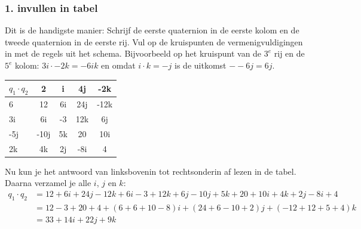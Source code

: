 \subsubsection{1. invullen in tabel} Dit is de handigste manier:  Schrijf de eerste quaternion in de eerste kolom en de tweede quaternion in de eerste rij. Vul op de kruispunten de 
vermenigvuldigingen in met de  regels uit het schema. Bijvoorbeeld op het kruispunt van de $ 3^e $ rij en de $   5^e $ kolom: $  3i\cdot -2k = -6ik   $ en omdat $ i\cdot k = -j $ is de uitkomst $ --6j = 6j $. 
\begin{center}
	\begin{tabular}{ | l || c | c |c |c |}
		\hline
		$ q_1\cdot q_2 $& 2 & i & 4j & -2k \\ \hline \hline
		6 & 12 & 6i & 24j & -12k  \\ \hline
		3i & 6i & -3 & 12k & 6j\\ \hline
		-5j & -10j &  5k & 20 & 10i\\ \hline
		2k & 4k & 2j & -8i & 4\\ 
		\hline 
	\end{tabular}
\end{center}
Nu kun je het antwoord van linksbovenin tot rechtsonderin af lezen in de tabel. Daarna verzamel je alle $i$, $j$ en $k$:
\begin{align*}
    q_1\cdot q_2 &= 12 + 6i + 24j - 12k + 6i - 3 + 12k + 6j - 10j + 5k + 20 + 10i + 4k + 2j - 8i + 4 \\
                 & = 12 - 3 + 20 + 4 + (6 + 6 + 10 - 8)i +(24 + 6 - 10 + 2)j +(-12 + 12 + 5 + 4)k \\
                 & = 33 + 14i + 22j + 9k
\end{align*}

\newpage
